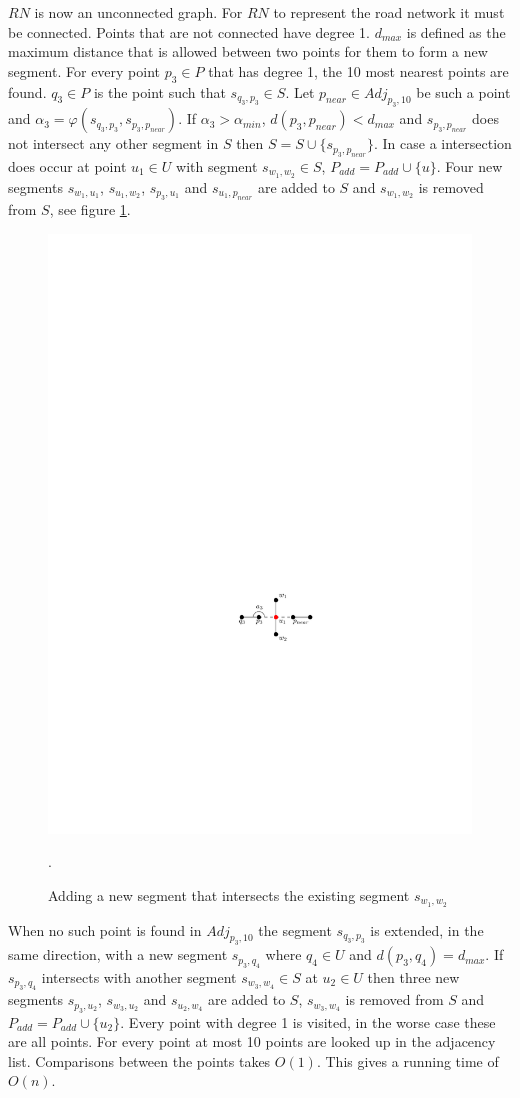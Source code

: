 \documentclass[11pt]{article}
\begin{document}
$RN$ is now an unconnected graph. For $RN$ to represent the road network it must be connected. Points that are not connected have degree 1. $d_{max}$ is defined as the maximum distance that is allowed between two points for them to form a new segment. For every point $p_3 \in P$ that has degree 1, the 10 most nearest points are found. $q_3 \in P$ is the point such that $s_{q_3, p_3} \in S$. Let $p_{near} \in Adj_{p_3,10}$ be such a point and $\alpha_3=\varphi(s_{q_3, p_3},s_{p_3, p_{near}})$. If $\alpha_3>\alpha_{min}$, $d(p_3,p_{near})<d_{max}$ and $s_{p_3, p_{near}}$ does not intersect any other segment in $S$ then $S=S \cup \{s_{p_3, p_{near}}\}$. In case a intersection does occur at point $u_1 \in U$ with segment $s_{w_1, w_2}\in S$, $P_{add}=P_{add}\cup \{u\}$. Four new segments $s_{w_1, u_1}$, $s_{u_1, w_2}$, $s_{p_3, u_1}$ and $s_{u_1, p_{near}}$ are added to $S$ and $s_{w_1, w_2}$ is removed from $S$, see figure \ref{addintersect}.

\begin{figure}[h]
\centering
      \graphicspath{ {images/}}
      \includegraphics[width=0.5\linewidth]{NetworkAddIntersection}
      \caption{Adding a new segment that intersects the existing segment $s_{w_1,w_2}$}.
      \label{addintersect}
  \end{figure}

When no such point is found in $Adj_{p_3,10}$ the segment $s_{q_3, p_3}$ is extended, in the same direction, with a new segment $s_{p_3,q_4}$ where $q_4 \in U$ and $d(p_3,q_4)=d_{max}$. If $s_{p_3,q_4}$ intersects with another segment $s_{w_3,w_4} \in S$ at $u_2 \in U$ then three new segments $s_{p_3,u_2}$, $s_{w_3,u_2}$ and $s_{u_2,w_4}$ are added to $S$, $s_{w_3,w_4}$ is removed from $S$ and $P_{add}=P_{add}\cup \{u_2\}$. Every point with degree 1 is visited, in the worse case these are all points. For every point at most 10 points are looked up in the adjacency list. Comparisons between the points takes $O(1)$. This gives a running time of $O(n)$.
\end{document}

